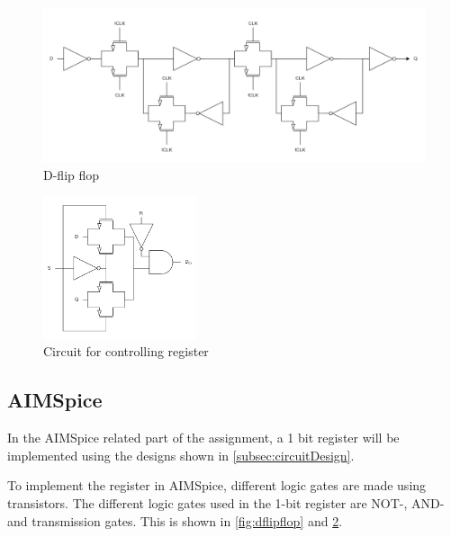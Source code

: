 \begin{figure}[H]
    \centering
    \includegraphics[width=\textwidth]{Figures/D_Flip_Flop.png}
    \caption{D-flip flop}
    \label{fig:dflipflop}
\end{figure}

\begin{figure}[H]
    \centering
    \includegraphics[width=0.4\textwidth]{Figures/setReset.png}
    \caption{Circuit for controlling register}
    \label{fig:setreset}
\end{figure}



\subsection{AIMSpice}
In the AIMSpice related part of the assignment, a 1 bit register will be implemented using the designs shown in \autoref{subsec:circuitDesign}. 

To implement the register in AIMSpice, different logic gates are made using transistors. The different logic gates used in the 1-bit register are NOT-, AND- and transmission gates. This is shown in \autoref{fig:dflipflop} and \ref{fig:setreset}.

